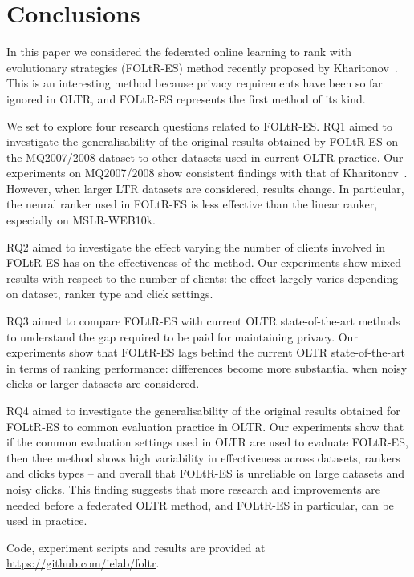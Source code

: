 \section{Conclusions}

In this paper we considered the federated online learning to rank with evolutionary strategies (FOLtR-ES) method recently proposed by Kharitonov~\cite{kharitonov2019federated}. This is an interesting method because privacy requirements have been so far ignored in OLTR, and FOLtR-ES represents the first method of its kind. 

We set to explore four research questions related to FOLtR-ES. RQ1 aimed to investigate the generalisability of the original results obtained by FOLtR-ES on the MQ2007/2008 dataset to other datasets used in current OLTR practice. Our  experiments on MQ2007/2008 show consistent findings with that of Kharitonov~\cite{kharitonov2019federated}. However, when larger LTR datasets are considered, results change. In particular, the neural ranker used in FOLtR-ES is less effective than the linear ranker, especially on MSLR-WEB10k. %

RQ2 aimed to investigate the effect varying the number of clients involved in FOLtR-ES has on the effectiveness of the method. %
Our experiments show mixed results with respect to the number of clients: the effect largely varies depending on dataset, ranker type and click settings. 

RQ3 aimed to compare FOLtR-ES with current OLTR state-of-the-art methods to understand the gap required to be paid for maintaining privacy. Our experiments show that FOLtR-ES lags behind the current OLTR state-of-the-art in terms of ranking performance: differences become more substantial when noisy clicks or larger datasets are considered. 

RQ4 aimed to investigate the generalisability of the original results obtained for FOLtR-ES to common evaluation practice in OLTR. Our experiments show that if the common evaluation settings used in OLTR are used to evaluate FOLtR-ES, then thee method shows high variability in effectiveness across datasets, rankers and clicks types -- and overall that FOLtR-ES is unreliable on large datasets and noisy clicks. This finding suggests that more research and improvements are needed before a federated OLTR method, and FOLtR-ES in particular, can be used in practice. 

Code, experiment scripts and results are provided at \url{https://github.com/ielab/foltr}. 
